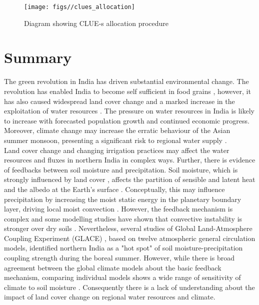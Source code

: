 \documentclass{icldt}\usepackage[]{graphicx}\usepackage[]{color}
\begin{document}
\setlength{\floatsep}{1pt}
\begin{figure}
\centering
\texttt{[image: figs//clues\_allocation]}
\caption[CLUE-s allocation procedure]{Diagram showing CLUE-s allocation procedure \citep{Verburg2002}}
\label{fig:allocation}
\end{figure}

%

\section{Summary}

The green revolution in India has driven substantial environmental change. The revolution has enabled India to become self sufficient in food grains \citep{Singh2000}, however, it has also caused widespread land cover change and a marked increase in the exploitation of water resources \citep{Shah2006,Roy2007,Scott2009}. The pressure on water resources in India is likely to increase with forecasted population growth and continued economic progress. Moreover, climate change may increase the erratic behaviour of the Asian summer monsoon, presenting a significant risk to regional water supply \citep{Goswami2006}. \\

Land cover change and changing irrigation practices may affect the water resources and fluxes in northern India in complex ways. Further, there is evidence of feedbacks between soil moisture and precipitation. Soil moisture, which is strongly influenced by land cover \citep{Dirmeyer2006,Lawrence2007a}, affects the partition of sensible and latent heat and the albedo at the Earth's surface \citep{Meehl1994,Pitman2003,Seneviratne2010}. Conceptually, this may influence precipitation by increasing the moist static energy in the planetary boundary layer, driving local moist convection \citep[e.g.][]{Eltahir1998}. However, the feedback mechanism is complex and some modelling studies have shown that convective instability is stronger over dry soils \citep{Findell2003a,Findell2003b}. Nevertheless, several studies of Global Land-Atmosphere Coupling Experiment (GLACE) \citep{Koster2004,Koster2006,Guo2006}, based on twelve atmospheric general circulation models, identified northern India as a "hot spot" of soil moisture-precipitation coupling strength during the boreal summer. However, while there is broad agreement between the global climate models about the basic feedback mechanism, comparing individual models shows a wide range of sensitivity of climate to soil moisture \citep{Koster2004,Guo2006,Pitman2009}. Consequently there is a lack of understanding about the impact of land cover change on regional water resources and climate. \\ 
\end{document}
